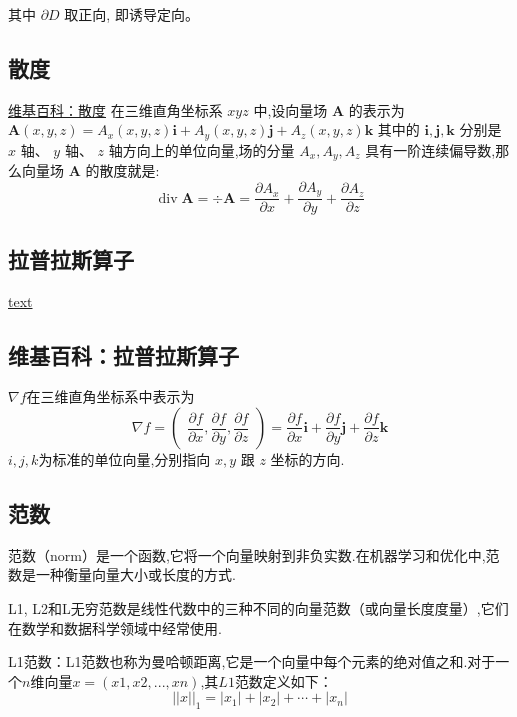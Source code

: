 \documentclass{book}
\begin{document}
其中 $\partial D$  取正向, 即诱导定向。

\subsection{散度}
\href{https://zh.wikipedia.org/zh-hans/%E6%95%A3%E5%BA%A6}{维基百科：散度} 
在三维直角坐标系  $x y z$  中,设向量场  $\boldsymbol{A}$  的表示为
$\boldsymbol{A}(x, y, z)=A_{x}(x, y, z) \boldsymbol{i}+A_{y}(x, y, z) \boldsymbol{j}+A_{z}(x, y, z) \boldsymbol{k}$ 其中的  $\boldsymbol{i}, \boldsymbol{j}, \boldsymbol{k} $ 分别是  $x$  轴、  $y$  轴、  $z$  轴方向上的单位向量,场的分量  $A_{x}, A_{y}, A_{z}$  具有一阶连续偏导数,那么向量场  $\boldsymbol{A}$  的散度就是:
\begin{equation}
    \operatorname{div} \boldsymbol{A}=\div \boldsymbol{A}=\dfrac{\partial A_{x}}{\partial x}+\dfrac{\partial A_{y}}{\partial y}+\dfrac{\partial A_{z}}{\partial z}
\end{equation}
\subsection{拉普拉斯算子}
\href{https://zh.wikipedia.org/zh-hans/%E6%8B%89%E6%99%AE%E6%8B%89%E6%96%AF%E7%AE%97%E5%AD%90}{text}
\subsection{维基百科：拉普拉斯算子}
$\nabla f$在三维直角坐标系中表示为
\begin{equation}
    {\displaystyle \nabla f={\begin{pmatrix}{\dfrac {\partial f}{\partial x}},{\dfrac {\partial f}{\partial y}},{\dfrac {\partial f}{\partial z}}\end{pmatrix}}={\dfrac {\partial f}{\partial x}}\mathbf {i} +{\dfrac {\partial f}{\partial y}}\mathbf {j} +{\dfrac {\partial f}{\partial z}}\mathbf {k} }
\end{equation}
$i, j, k $为标准的单位向量,分别指向 $x, y$ 跟 $z$ 坐标的方向.
\subsection{范数}
范数（norm）是一个函数,它将一个向量映射到非负实数.在机器学习和优化中,范数是一种衡量向量大小或长度的方式.

L1, L2和L无穷范数是线性代数中的三种不同的向量范数（或向量长度度量）,它们在数学和数据科学领域中经常使用.

L1范数：L1范数也称为曼哈顿距离,它是一个向量中每个元素的绝对值之和.对于一个$n$维向量$x = (x1, x2, ..., xn)$,其$L1$范数定义如下：
\begin{equation}
    ||x||_1 = |x_1| + |x_2| + \cdots + |x_n|
\end{equation}
\end{document}
